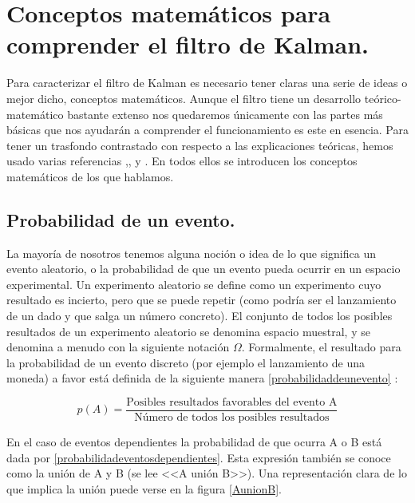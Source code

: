 \pagestyle{scrheadings}
\ihead[]{\rightmark}
\ofoot[]{\thepage{}}
\chapter{Conceptos matemáticos para comprender el filtro de Kalman.}\label{ApendiceA}

Para caracterizar el filtro de Kalman es necesario tener claras una serie de ideas o mejor dicho, conceptos matemáticos. 
Aunque el filtro tiene un desarrollo teórico-matemático bastante extenso nos quedaremos únicamente con las partes más básicas que nos ayudarán a comprender el funcionamiento es este en esencia. 
Para tener un trasfondo contrastado con respecto a las explicaciones teóricas, hemos usado varias referencias \cite{Matematicas2004},\cite{Matematicasaplicadas2005},\cite{AnIntroductionToTheKalmanFilter} y \cite{IntroduccionMatematicaKalman}. En todos ellos se introducen los conceptos matemáticos de los que hablamos.

\section{Probabilidad de un evento.}

La mayoría de nosotros tenemos alguna noción o idea de lo que significa un evento aleatorio, o la probabilidad de que un evento pueda ocurrir en un espacio experimental.
Un experimento aleatorio se define como un experimento cuyo resultado es incierto, pero que se puede repetir (como podría ser el lanzamiento de un dado y que salga un número concreto). 
El conjunto de todos los posibles resultados de un experimento aleatorio se denomina espacio muestral, y se denomina a menudo con la siguiente notación $\Omega$. 
Formalmente, el resultado para la probabilidad de un evento discreto (por ejemplo el lanzamiento de una moneda) a favor está definida de la siguiente manera \ref{probabilidaddeunevento} :

\begin{equation}\label{probabilidaddeunevento}
p(A) = \frac{\textrm{Posibles  resultados  favorables  del  evento  A}}{\textrm{Número de todos los posibles resultados}}
\end{equation}

En el caso de eventos dependientes la probabilidad de que ocurra A o B está dada por \ref{probabilidadeventosdependientes}. 
Esta expresión también se conoce como la unión de A y B (se lee <<A unión B>>). Una representación clara de lo que implica la unión puede verse en la figura \ref{AunionB}.

